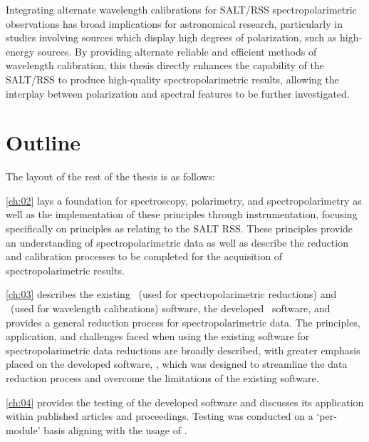 
Integrating alternate wavelength calibrations for \gls{SALT}/\gls{RSS} spectro\-polarimetric observations has broad implications for astronomical research, particularly in studies involving sources which display high degrees of polarization, such as high-energy sources.
By providing alternate reliable and efficient methods of wavelength calibration, this thesis directly enhances the capability of the \gls{SALT}/\gls{RSS} to produce high-quality spectropolarimetric results, allowing the interplay between polarization and spectral features to be further investigated.

\section{Outline}

\noindent The layout of the rest of the thesis is as follows:

\autoref{ch:02} lays a foundation for spectroscopy, polarimetry, and spectropolarimetry as well as the implementation of these principles through instrumentation, focusing specifically on principles as relating to the \gls{SALT} \gls{RSS}.
These principles provide an understanding of spectropolarimetric data as well as describe the reduction and calibration processes to be completed for the acquisition of spectropolarimetric results.

\autoref{ch:03} describes the existing \polsalt\ (used for spectropolarimetric reductions) and \iraf\ (used for wavelength calibrations) software, the developed \stops\ software, and provides a general reduction process for spectropolarimetric data.
The principles, application, and challenges faced when using the existing software for spectropolarimetric data reductions are broadly described, with greater emphasis placed on the developed software, \stops, which was designed to streamline the data reduction process and overcome the limitations of the existing software.

\autoref{ch:04} provides the testing of the developed software and discusses its application within published articles and proceedings.
Testing was conducted on a `per-module' basis aligning with the usage of \stops.

